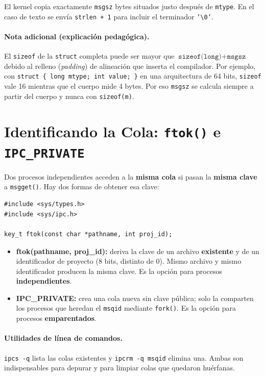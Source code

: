 \documentclass[12pt,a4paper]{article}
\begin{document}
El kernel copia exactamente \texttt{msgsz} bytes situados justo después de \texttt{mtype}. En el caso de texto se envía \texttt{strlen + 1} para incluir el terminador \texttt{'\textbackslash 0'}.

\paragraph{Nota adicional (explicación pedagógica).} El \texttt{sizeof} de la \texttt{struct} completa puede ser mayor que $\texttt{sizeof(long)} + \texttt{msgsz}$ debido al relleno (\textit{padding}) de alineación que inserta el compilador. Por ejemplo, con \texttt{struct \{ long mtype; int value; \}} en una arquitectura de 64 bits, \texttt{sizeof} vale 16 mientras que el cuerpo mide 4 bytes. Por eso \texttt{msgsz} se calcula siempre a partir del cuerpo y nunca con \texttt{sizeof(m)}.

\section{Identificando la Cola: \texttt{ftok()} e \texttt{IPC\_PRIVATE}}
Dos procesos independientes acceden a la \textbf{misma cola} si pasan la \textbf{misma clave} a \texttt{msgget()}. Hay dos formas de obtener esa clave:

\begin{lstlisting}[numbers=none]
#include <sys/types.h>
#include <sys/ipc.h>

key_t ftok(const char *pathname, int proj_id);
\end{lstlisting}

\begin{itemize}
    \item \textbf{ftok(pathname, proj\_id):} deriva la clave de un archivo \textbf{existente} y de un identificador de proyecto (8 bits, distinto de $0$). Mismo archivo y mismo identificador producen la misma clave. Es la opción para procesos \textbf{independientes}.
    \item \textbf{IPC\_PRIVATE:} crea una cola nueva sin clave pública; solo la comparten los procesos que heredan el \texttt{msqid} mediante \texttt{fork()}. Es la opción para procesos \textbf{emparentados}.
\end{itemize}

\paragraph{Utilidades de línea de comandos.} \texttt{ipcs -q} lista las colas existentes y \texttt{ipcrm -q msqid} elimina una. Ambas son indispensables para depurar y para limpiar colas que quedaron huérfanas.
\end{document}
